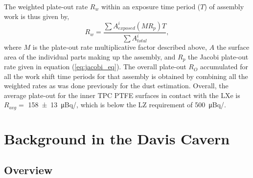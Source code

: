The weighted plate-out rate $R_w$ within an exposure time period ($T$) of assembly work is thus given by,
%
\begin{equation}
    R_w = \frac{\sum A_{exposed}^i (M R_p)T}{\sum A_{total}^i},
    \label{eq:weighted_plate-out}
\end{equation}
%
where $M$ is the plate-out rate multiplicative factor described above, $A$ the surface area of the individual parts making up the assembly, and ${R_p}$ the Jacobi plate-out rate given in equation (\ref{eq:jacobi_eq}). The overall plate-out $R_O$ accumulated for all the work shift time periods for that assembly is obtained by combining all the weighted rates as was done previously for the dust estimation. Overall, the average plate-out for the inner TPC PTFE surfaces in contact with the LXe is $R_{avg}=$ \SI{158\pm 13} {\micro \becquerel}/\squaremeter, which is below the LZ requirement of \SI{500} {\micro\becquerel}/\squaremeter.


\section{\gray{} Background in the Davis Cavern}
\label{sec:external_backgrounds}

\subsection{Overview}

